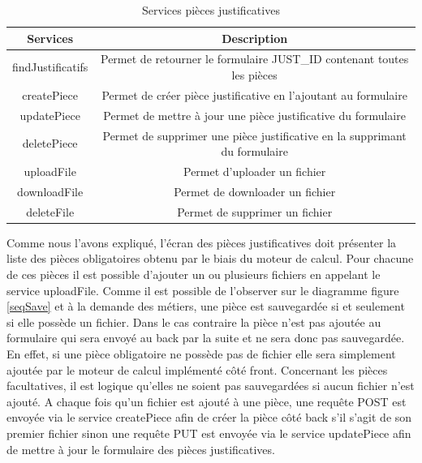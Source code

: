 \begin{table}[h!]
	\center
	\begin{tabular}{| c | c |}
     \hline
     Services & Description \\ \hline
     findJustificatifs & Permet de retourner le formulaire JUST\_ID contenant toutes les pièces \\ \hline
     createPiece & Permet de créer pièce justificative en l'ajoutant au formulaire \\ \hline
     updatePiece & Permet de mettre à jour une pièce justificative du formulaire \\ \hline
     deletePiece & Permet de supprimer une pièce justificative en la supprimant du formulaire \\ \hline
     uploadFile & Permet d'uploader un fichier \\ \hline
     downloadFile & Permet de downloader un fichier \\ \hline
     deleteFile & Permet de supprimer un fichier\\ \hline
	\end{tabular}
	\caption{Services pièces justificatives}
	\label{servicesPJ}
\end{table}

	Comme nous l'avons expliqué, l'écran des pièces justificatives doit présenter la liste des pièces obligatoires obtenu par le biais du moteur de calcul. Pour chacune de ces pièces il est possible d'ajouter un ou plusieurs fichiers en appelant le service uploadFile. Comme il est possible de l'observer sur le diagramme figure \ref{seqSave} et à la demande des métiers, une pièce est sauvegardée si et seulement si elle possède un fichier. Dans le cas contraire la pièce n'est pas ajoutée au formulaire qui sera envoyé au back par la suite et ne sera donc pas sauvegardée. En effet, si une pièce obligatoire ne possède pas de fichier elle sera simplement ajoutée par le moteur de calcul implémenté côté front. Concernant les pièces facultatives, il est logique qu'elles ne soient pas sauvegardées si aucun fichier n'est ajouté. A chaque fois qu'un fichier est ajouté à une pièce, une requête POST est envoyée via le service createPiece afin de créer la pièce côté back s'il s'agit de son premier fichier sinon une requête PUT est envoyée via le service updatePiece afin de mettre à jour le formulaire des pièces justificatives.

